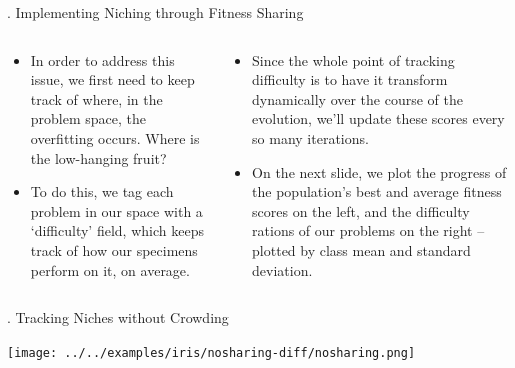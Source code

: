 \documentclass[9pt]{beamer}
\begin{document}
\begin{frame}{\theframenumber. Implementing Niching through Fitness Sharing}
  \begin{columns}
    \begin{column}{.5\textwidth}
      \begin{itemize}
      \item In order to address this issue, we first need to keep track of where, in the problem space, the overfitting occurs. Where is the low-hanging fruit?
      \item To do this, we tag each problem in our space with a `difficulty' field, which keeps track of how our specimens perform on it, on average. 
      \end{itemize}
    \end{column}
    \begin{column}{.5\textwidth}
      \begin{itemize}
      \item Since the whole point of tracking difficulty is to have it transform dynamically over the course of the evolution, we'll update these scores every so many iterations.
      \item On the next slide, we plot the progress of the population's best and average fitness scores on the left, and the difficulty rations of our problems on the right -- plotted by class mean and standard deviation. 
      \end{itemize}

    \end{column}
    \end{columns}
\end{frame}

\begin{frame}{\theframenumber. Tracking Niches without Crowding}
  \begin{center}
    \texttt{[image: ../../examples/iris/nosharing-diff/nosharing.png]}
  \end{center}
\end{frame}
\end{document}
